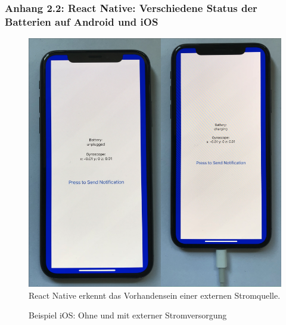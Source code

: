 \documentclass[a4paper]{scrartcl}
\begin{document}
\newpage

\subsubsection*{Anhang 2.2: React Native: Verschiedene Status der Batterien auf Android und iOS}

\begin{figure}[H]
	\centering
	\caption{Beispiel iOS: Ohne und mit externer Stromversorgung}
	\includegraphics[scale=0.3]{_assets/iOS_unpugged_charging.png} \\
	\justifying
	\small	
	React Native erkennt das Vorhandensein einer externen Stromquelle. 
\end{figure}
\end{document}
